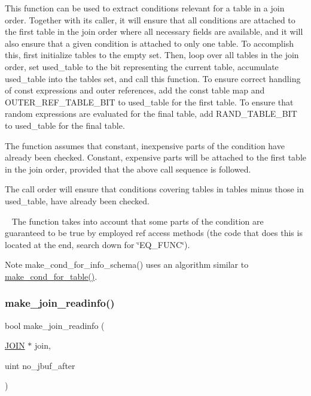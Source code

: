 This function can be used to extract conditions relevant for a table in a join order. Together with its caller, it will ensure that all conditions are attached to the first table in the join order where all necessary fields are available, and it will also ensure that a given condition is attached to only one table. To accomplish this, first initialize {\ttfamily tables} to the empty set. Then, loop over all tables in the join order, set {\ttfamily used\+\_\+table} to the bit representing the current table, accumulate {\ttfamily used\+\_\+table} into the {\ttfamily tables} set, and call this function. To ensure correct handling of const expressions and outer references, add the const table map and O\+U\+T\+E\+R\+\_\+\+R\+E\+F\+\_\+\+T\+A\+B\+L\+E\+\_\+\+B\+IT to {\ttfamily used\+\_\+table} for the first table. To ensure that random expressions are evaluated for the final table, add R\+A\+N\+D\+\_\+\+T\+A\+B\+L\+E\+\_\+\+B\+IT to {\ttfamily used\+\_\+table} for the final table.

The function assumes that constant, inexpensive parts of the condition have already been checked. Constant, expensive parts will be attached to the first table in the join order, provided that the above call sequence is followed.

The call order will ensure that conditions covering tables in {\ttfamily tables} minus those in {\ttfamily used\+\_\+table}, have already been checked.

~\newline
 The function takes into account that some parts of the condition are guaranteed to be true by employed \textquotesingle{}ref\textquotesingle{} access methods (the code that does this is located at the end, search down for \char`\"{}\+E\+Q\+\_\+\+F\+U\+N\+C\char`\"{}).

\begin{DoxyNote}{Note}
make\+\_\+cond\+\_\+for\+\_\+info\+\_\+schema() uses an algorithm similar to \mbox{\hyperlink{group__Query__Optimizer_gaedf2fb3248e5d013e6a74b29dd9e7429}{make\+\_\+cond\+\_\+for\+\_\+table()}}. 
\end{DoxyNote}
\mbox{\label{group__Query__Optimizer_ga27b74179b9a9207753aa3f93a9df4225}} 
\subsubsection{\texorpdfstring{make\+\_\+join\+\_\+readinfo()}{make\_join\_readinfo()}}
{\footnotesize\ttfamily bool make\+\_\+join\+\_\+readinfo (\begin{DoxyParamCaption}\item[{\mbox{\hyperlink{classJOIN}{J\+O\+IN}} $\ast$}]{join,  }\item[{uint}]{no\+\_\+jbuf\+\_\+after }\end{DoxyParamCaption})}

